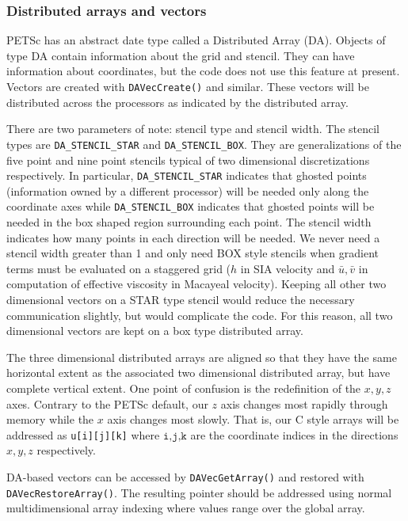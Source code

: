 \documentclass[12pt,final]{amsart}
\begin{document}
\subsubsection{Distributed arrays and vectors} PETSc has an abstract date type called a Distributed Array (DA). Objects of type DA contain
information about the grid and stencil. They can have information about coordinates, but
the code does not use this feature at present. Vectors are created with
\texttt{DAVecCreate()} and similar. These vectors will be distributed across the
processors as indicated by the distributed array.

There are two parameters of note: stencil type and stencil width.  The stencil types are
\verb|DA_STENCIL_STAR| and \verb|DA_STENCIL_BOX|.  They are generalizations of the five
point and nine point stencils typical of two dimensional discretizations respectively.  In
particular, \verb|DA_STENCIL_STAR| indicates that ghosted points (information owned by a
different processor) will be needed only along the coordinate axes while
\verb|DA_STENCIL_BOX| indicates that ghosted points will be needed in the box shaped
region surrounding each point.  The stencil width indicates how many points in each
direction will be needed.  We never need a stencil width greater than 1 and only need BOX
style stencils when gradient terms must be evaluated on a staggered grid ($h$ in SIA
velocity and $\bar{u},\bar{v}$ in computation of effective viscosity in Macayeal
velocity).  Keeping all other two dimensional vectors on a STAR type stencil
would reduce the necessary communication slightly, but would complicate the code.  For this
reason, all two dimensional vectors are kept on a box type distributed array.

The three dimensional distributed arrays are aligned so that they have the same horizontal
extent as the associated two dimensional distributed array, but have complete vertical
extent. One point of confusion is the redefinition of the $x,y,z$ axes. Contrary to the
PETSc default, our $z$ axis changes most rapidly through memory while the $x$ axis changes
most slowly. That is, our C style arrays will be addressed as \texttt{u[i][j][k]} where
$\texttt{i,j,k}$ are the coordinate indices in the directions $x,y,z$ respectively.

DA-based vectors can be accessed by \texttt{DAVecGetArray()} and restored with
\texttt{DAVecRestoreArray()}. The resulting pointer should be addressed using normal
multidimensional array indexing where values range over the global array.
\end{document}
